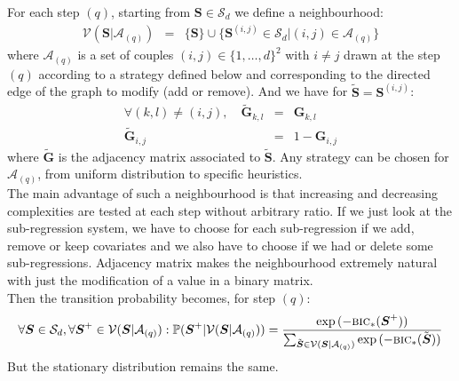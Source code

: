 \documentclass[12pt,a4paper]{report}
\begin{document}
For each step $(q)$, starting from $\boldsymbol{S} \in \mathcal{S}_d$ we define a neighbourhood:
		\begin{eqnarray}
		\mathcal{V}(\boldsymbol{S}|\mathcal{A}_{(q)})&=& \{\boldsymbol{S} \}\cup \{ \boldsymbol{S}^{(i,j)} \in \mathcal{S}_d|(i,j) \in \mathcal{A}_{(q)}\} \nonumber 
	\end{eqnarray}	
	where $\mathcal{A}_{(q)}$ is a set of couples $(i,j) \in \{1,\dots,d \}^2$ with $i\neq j$ drawn at the step $(q)$ according to a strategy defined below and corresponding to the directed edge of the graph to modify (add or remove).
	And we have for  $\tilde{\boldsymbol{S}}=\boldsymbol{S}^{(i,j)}$:
	\begin{eqnarray}
		\forall (k,l)\neq (i,j), \quad	\tilde{\boldsymbol{G}}_{k,l}&=&\boldsymbol{G}_{k,l} \nonumber  \\
		\tilde{\boldsymbol{G}}_{i,j}&=&1-\boldsymbol{G}_{i,j}  \nonumber 
	\end{eqnarray}
	where $\tilde{\boldsymbol{G}}$ is the adjacency matrix associated to $\tilde{\boldsymbol{S}}$. Any strategy can be chosen for $\mathcal{A}_{(q)}$, from uniform distribution to specific heuristics.\\
	
The main advantage of such a neighbourhood is that increasing and decreasing complexities are tested at each step without arbitrary ratio. If we just look at the sub-regression system, we have to choose for each sub-regression if we add, remove or keep covariates and we also have to choose if we had or delete some sub-regressions. Adjacency matrix makes the neighbourhood extremely natural with just the modification of a value in a binary matrix. \\
Then the transition probability becomes, for step $(q)$:
\begin{equation}
	\forall \boldsymbol{S} \in \mathcal{S}_d, \forall \boldsymbol{S}^+\in \mathcal{V}(\boldsymbol{S}|\mathcal{A}_{(q)}): %
			\mathbb{P}(\boldsymbol{S}^+|\mathcal{V}(\boldsymbol{S}|\mathcal{A}_{(q)}))=\frac{\exp{(-\mbox{{\sc bic}}_*(\boldsymbol{S}^+))}}{\sum_{\tilde{\boldsymbol{S}}\in \mathcal{V}(\boldsymbol{S}|\mathcal{A}_{(q)})}\exp{(-\mbox{{\sc bic}}_*(\tilde{\boldsymbol{S}}))}}\nonumber
\end{equation}
But the stationary distribution remains the same.
\end{document}
